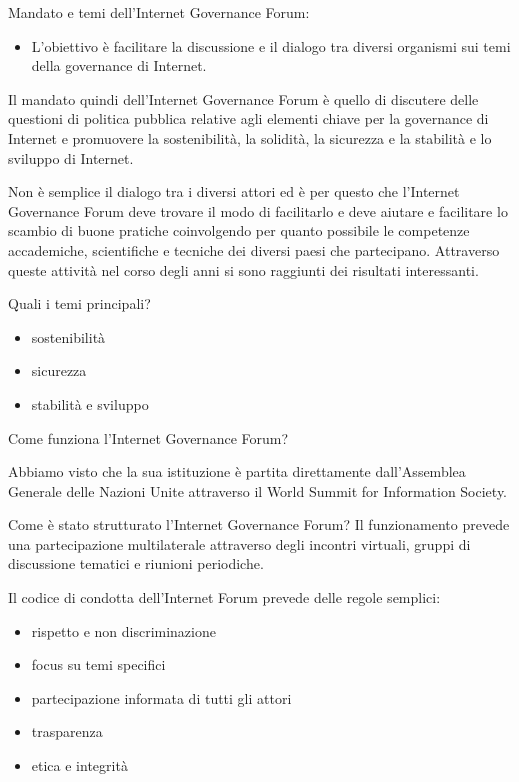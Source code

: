    Mandato e temi dell'Internet Governance Forum:
   \begin{itemize}
       \item L'obiettivo è facilitare la discussione e il dialogo tra diversi organismi sui temi della governance di Internet. 
   \end{itemize}
   Il mandato quindi dell'Internet Governance Forum è quello di discutere delle questioni di politica pubblica relative agli elementi chiave per la governance di Internet e promuovere la sostenibilità, la solidità, la sicurezza e la stabilità e lo sviluppo di Internet.\par 
   Non è semplice il dialogo tra i diversi attori ed è per questo che l'Internet Governance Forum deve trovare il modo di facilitarlo e deve aiutare e facilitare lo scambio di buone pratiche coinvolgendo per quanto possibile le competenze accademiche, scientifiche e tecniche dei diversi paesi che partecipano. Attraverso queste attività nel corso degli anni si sono raggiunti dei risultati interessanti. 
   
   Quali i temi principali? 

   \begin{itemize}
       \item sostenibilità
       \item sicurezza
       \item stabilità e sviluppo
   \end{itemize}
   
   Come funziona l'Internet Governance Forum? 
   
   Abbiamo visto che la sua istituzione è partita direttamente dall'Assemblea Generale delle Nazioni Unite attraverso il World Summit for Information Society.\par
   
   Come è stato strutturato l'Internet Governance Forum? Il funzionamento prevede una partecipazione multilaterale attraverso degli incontri virtuali, gruppi di discussione tematici e riunioni periodiche. \par
   Il codice di condotta dell'Internet Forum prevede delle regole semplici:
   
   \begin{itemize}
       \item rispetto e non discriminazione
       \item focus su temi specifici
       \item partecipazione informata di tutti gli attori
       \item trasparenza
       \item etica e integrità
   \end{itemize}
   
